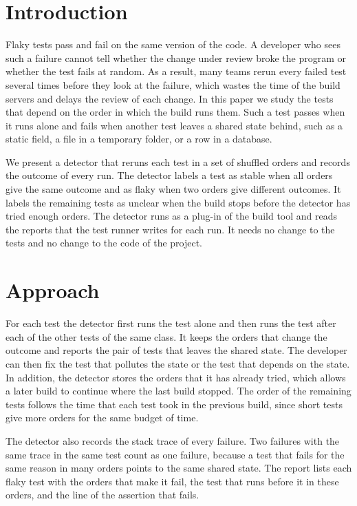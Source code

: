 \section{Introduction}
Flaky tests pass and fail on the same version of the code. A developer who sees such a failure cannot tell whether
the change under review broke the program or whether the test fails at random. As a result, many teams rerun every
failed test several times before they look at the failure, which wastes the time of the build servers and delays
the review of each change. In this paper we study the tests that depend on the order in which the build runs them.
Such a test passes when it runs alone and fails when another test leaves a shared state behind, such as a static
field, a file in a temporary folder, or a row in a database.

We present a detector that reruns each test in a set of shuffled orders and records the outcome of every run. The
detector labels a test as stable when all orders give the same outcome and as flaky when two orders give different
outcomes. It labels the remaining tests as unclear when the build stops before the detector has tried enough
orders. The detector runs as a plug-in of the build tool and reads the reports that the test runner writes for each
run. It needs no change to the tests and no change to the code of the project.

\section{Approach}
For each test the detector first runs the test alone and then runs the test after each of the other tests of the
same class. It keeps the orders that change the outcome and reports the pair of tests that leaves the shared state.
The developer can then fix the test that pollutes the state or the test that depends on the state. In addition, the
detector stores the orders that it has already tried, which allows a later build to continue where the last build
stopped. The order of the remaining tests follows the time that each test took in the previous build, since short
tests give more orders for the same budget of time.

The detector also records the stack trace of every failure. Two failures with the same trace in the same test count
as one failure, because a test that fails for the same reason in many orders points to the same shared state. The
report lists each flaky test with the orders that make it fail, the test that runs before it in these orders, and
the line of the assertion that fails.

